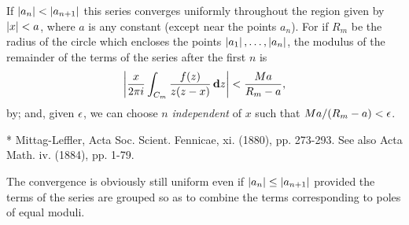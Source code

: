 If $\left| a_{n} \right| < \left| a_{n+1} \right|$ this series converges uniformly
throughout the region given by $\left| x \right| < a$, where $a$ is any constant
(except near the points $a_{n}$).
For if $R_{m}$ be the radius of the circle which encloses the points
$\left| a_{1} \right|, \ldots, \left| a_{n} \right|$,
the modulus of the remainder of the terms of the series after the first $n$ is
$$
\left|  \frac{x}{2 \pi i}
  \int_{C_{m}} \frac{f(z)}{z(z-x)} \, \mathbf{d} z
 \right|
< \frac{Ma}{R_{m}-a},
$$
by; and, given
$\epsilon$, we can choose $n$ \emph{independent} of $x$
such that $Ma/(R_{m}-a) < \epsilon$.

* Mittag-Leffler, Acta Soc. Scient. Fennicae, xi. (1880), pp. 273-293.
See also Acta Math. iv. (1884), pp. 1-79.

%
%

The convergence is obviously still uniform even if
$\left| a_{n} \right| \leq \left| a_{n+1} \right|$
provided the terms of the series are grouped so as to combine the
terms corresponding to poles of equal moduli.


